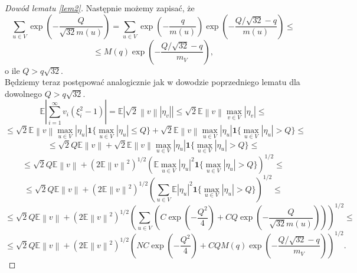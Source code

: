 \documentclass{mwart}
\newcommand{\norm}[1]{\left\lVert#1\right\rVert}
\begin{document}
\begin{proof}[Dowód lematu \ref{lem2}]
Następnie możemy zapisać, że
\begin{displaymath}
\sum_{u\in V}\exp\left(-\frac{Q}{\sqrt{32}m(u)}\right)=\sum_{u\in V}\exp\left(-\frac{q}{m(u)}\right)\exp \left(-\frac{Q/\sqrt{32}-q}{m(u)}\right)\leq 
\end{displaymath}
\begin{displaymath}
\leq M(q)\exp \left(-\frac{Q/\sqrt{32}-q}{m_V}\right),
\end{displaymath}
o ile $Q>q\sqrt{32}$.\\
Będziemy teraz postępować analogicznie jak w dowodzie poprzedniego lematu dla dowolnego $Q>q\sqrt{32}$.
\begin{displaymath}
\mathbb{E}\left|\sum_{i=1}^{\infty}v_i(\xi_i^2-1)\right|=\mathbb{E}\left|\sqrt{2}\norm{v}|\eta_v|\right|\leq \sqrt{2}\mathbb{E}\norm{v}\max_{v\in V}|\eta_v|\leq
\end{displaymath}
\begin{displaymath}
\leq \sqrt{2}\mathbb{E}\norm{v}\max_{u\in V}|\eta_u|\pmb{1}\{\max_{u\in V}|\eta_u|\leq Q\}+\sqrt{2}\mathbb{E}\norm{v}\max_{u\in V}|\eta_u|\pmb{1}\{\max_{u\in V}|\eta_u|> Q\}\leq
\end{displaymath}
\begin{displaymath}
\leq \sqrt{2}Q\mathbb{E}\norm{v}+\sqrt{2}\mathbb{E}\norm{v}\max_{u\in V}|\eta_u|\pmb{1}\{\max_{u\in V}|\eta_u|> Q\}\leq
\end{displaymath}
\begin{displaymath}
\leq \sqrt{2}Q\mathbb{E}\norm{v}+\left(2\mathbb{E}\norm{v}^2\right)^{1/2}\left(\mathbb{E}\max_{u\in V}|\eta_u|^2\pmb{1}\{\max_{u\in V}|\eta_u|> Q\}\right)^{1/2}\leq
\end{displaymath}
\begin{displaymath}
\leq \sqrt{2}Q\mathbb{E}\norm{v}+\left(2\mathbb{E}\norm{v}^2\right)^{1/2}\left(\sum_{u\in V}\mathbb{E}|\eta_u|^2\pmb{1}\{\max_{u\in V}|\eta_u|> Q\}\right)^{1/2}\leq
\end{displaymath}
\begin{displaymath}
\leq \sqrt{2}Q\mathbb{E}\norm{v}+\left(2\mathbb{E}\norm{v}^2\right)^{1/2}\left(\sum_{u\in V}\left(C\exp\left(-\frac{Q^2}{4}\right)+CQ\exp \left(-\frac{Q}{\sqrt{32}m(u)}\right)\right)\right)^{1/2}\leq 
\end{displaymath}
\begin{displaymath}
\leq \sqrt{2}Q\mathbb{E}\norm{v}+\left(2\mathbb{E}\norm{v}^2\right)^{1/2}\left(NC\exp\left(-\frac{Q^2}{4}\right)+CQM(q)\exp \left(-\frac{Q/\sqrt{32}-q}{m_V}\right)\right)^{1/2}.
\end{displaymath}

\end{proof}
\end{document}
